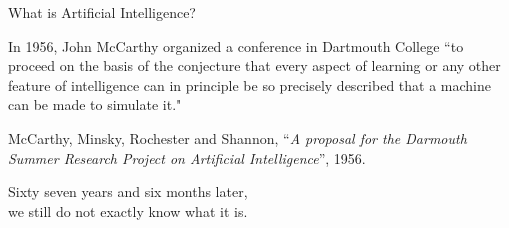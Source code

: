 \documentclass{beamer}
\begin{document}
\begin{frame}{What is Artificial Intelligence?}
\begin{center}
In 1956, John McCarthy organized a conference in Dartmouth College ``to proceed on the basis of the conjecture that every aspect of learning or any other feature of intelligence can in principle be so precisely described that a machine can be made to simulate it."
\end{center}

\begin{footnotesize}{McCarthy,  Minsky, Rochester and Shannon, ``\emph{A proposal for the Darmouth Summer Research Project on Artificial Intelligence}'', 1956.}
\end{footnotesize}

\vspace{0.5cm}
\centering
Sixty seven years and six months later,\\ we still do not exactly know what it is. 

\end{frame}
\end{document}
